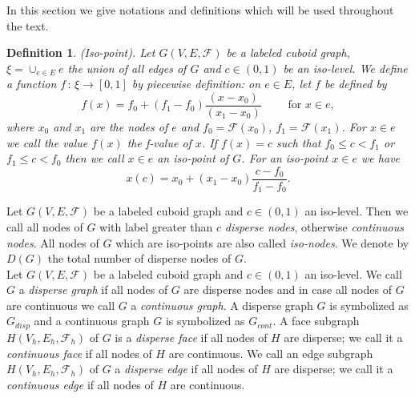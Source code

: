 \documentclass[a4paper,11pt]{article}
\newtheorem{definition}[theorem]{Definition}
\begin{document}
In this section we give notations and definitions which will be used throughout the text.
\begin{definition}(Iso-point). Let $G(V,E,\mathcal{F})$ be a labeled cuboid graph, $\xi=\cup_{e\in E}e$
the union of all edges of $G$ and $c\in (0,1)$ be an iso-level. We define a function
$f\,:\,\xi\longrightarrow [0,1]$ by piecewise definition:  on $e\in E$, let $f$ be defined by
\begin{equation}
f(x)=f_0+(f_1-f_0)\frac{(x-x_0)}{(x_1-x_0)}\qquad \mbox{ for } x\in e,
\label{eq:labeled-graph-11}
\end{equation}
where $x_0$ and $x_1$ are the nodes of $e$ and $f_0=\mathcal{F}(x_0)$, $f_1=\mathcal{F}(x_1)$.
For $x\in e$ we call the value $f(x)$ the f-value of $x$. If $f(x)=c$ such that $f_0\leq c<f_1$ or
$f_1\leq c<f_0$ then we call $x\in e$ an {\it iso-point} of $G$. For an iso-point $x\in e$ we have
\begin{equation}
x(c) = x_0+(x_1-x_0)\frac{c-f_0}{f_1-f_0}.
\label{eq:labeled-graph-12}
\end{equation}
\label{def:labeled-graph-5}
\end{definition}

Let $G(V,E,\mathcal{F})$ be a labeled cuboid
graph and $c\in (0,1)$ an iso-level. Then we call all nodes of $G$ with label greater than $c$ {\it disperse nodes},
otherwise {\it continuous nodes}. All nodes of $G$ which are iso-points are also called {\it iso-nodes}. We denote
by $D(G)$ the total number of disperse nodes of $G$. \\

Let $G(V,E,\mathcal{F})$ be a labeled cuboid graph and
$c\in (0,1)$ an iso-level. We call $G$ a {\it disperse graph} if all nodes of $G$ are disperse nodes and in case
all nodes of $G$ are continuous we call $G$ a {\it continuous graph}. A disperse graph $G$ is symbolized as
$G_{disp}$ and a continuous graph $G$ is symbolized as $G_{cont}$. A face subgraph $H(V_h,E_h,\mathcal{F}_h)$ of
$G$ is a {\it disperse face} if all nodes of $H$ are disperse; we call it a {\it continuous face} if all nodes of
$H$ are continuous. We call an edge subgraph $H(V_h,E_h,\mathcal{F}_h)$ of $G$ a {\it disperse edge} if all nodes of
$H$ are disperse; we call it a {\it continuous edge} if all nodes of $H$ are continuous.\\
\end{document}
